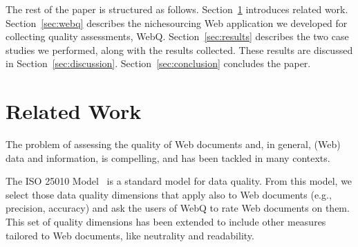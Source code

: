 \documentclass{llncs}
\begin{document}
The rest of the paper is structured as follows. Section~\ref{sec:related} introduces related work. Section~\ref{sec:webq} describes the nichesourcing Web application we developed for collecting quality assessments, WebQ.
Section~\ref{sec:results} describes the two case studies we performed, along with the results collected. These results are discussed in Section~\ref{sec:discussion}. Section~\ref{sec:conclusion} concludes the paper.


\section{Related Work}
\label{sec:related}

The problem of assessing the quality of Web documents and, in general, (Web) data and information, is compelling, and has been tackled in many contexts. 

The ISO 25010 Model~\cite{iso} is a standard model for data quality. From this model, we select those data quality dimensions that apply also to Web documents (e.g., precision, accuracy) and ask the users of WebQ to rate Web documents on them. This set of quality dimensions has been extended to include other measures tailored to Web documents, like neutrality and readability.
\end{document}
